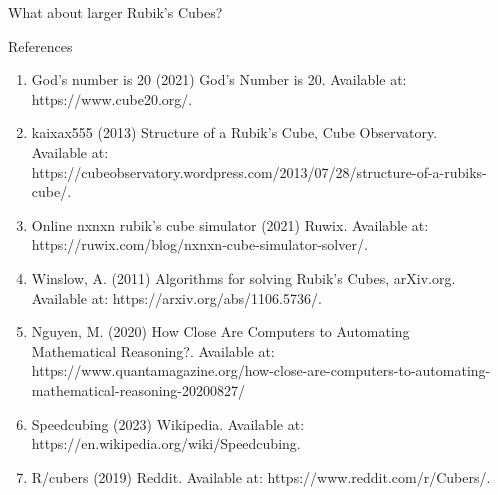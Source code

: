 \documentclass[final]{beamer}
\newlength{\sepwidth}
\newlength{\colwidth}
\newcommand{\separatorcolumn}{\begin{column}{\sepwidth}\end{column}}
\begin{document}
\begin{frame}[t]
\begin{columns}[t]
\begin{column}{\colwidth}
\begin{block}{What about larger Rubik's Cubes?}
  \end{block}

  \begin{block}{References}

    \nocite{*}
    \footnotesize{}
    \begin{enumerate}
    \item God’s number is 20 (2021) God’s Number is 20. Available at: https://www.cube20.org/.\\[0.1cm]
    \item kaixax555 (2013) Structure of a Rubik’s Cube, Cube Observatory. Available at: https://cubeobservatory.wordpress.com/2013/07/28/structure-of-a-rubiks-cube/.  \\[0.1cm]
    \item Online nxnxn rubik’s cube simulator (2021) Ruwix. Available at: https://ruwix.com/blog/nxnxn-cube-simulator-solver/.  \\[0.1cm]
    \item Winslow, A. (2011) Algorithms for solving Rubik’s Cubes, arXiv.org. Available at: https://arxiv.org/abs/1106.5736/.  \\[0.1cm]
    \item Nguyen, M. (2020) How Close Are Computers to Automating Mathematical Reasoning?. Available at: https://www.quantamagazine.org/how-close-are-computers-to-automating-mathematical-reasoning-20200827/ \\[0.1cm]
    \item Speedcubing (2023) Wikipedia. Available at: https://en.wikipedia.org/wiki/Speedcubing. \\[0.1cm] 
    \item R/cubers (2019) Reddit. Available at: https://www.reddit.com/r/Cubers/. 
    \end{enumerate}
  \end{block}

\end{column}

\separatorcolumn
\end{columns}
\end{frame}
\end{document}
